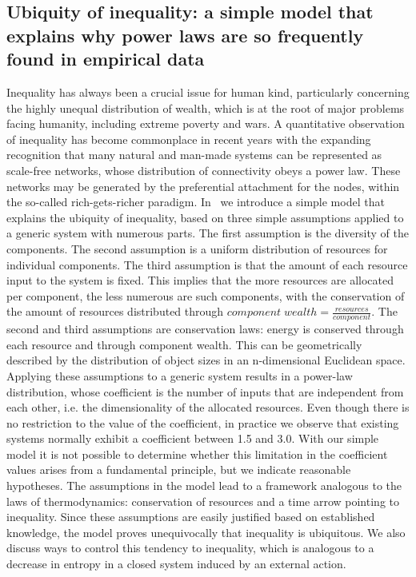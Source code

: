 \begin{apendicesenv}
\section{Ubiquity of inequality: a simple model that explains why power laws are so frequently found in empirical data}
	Inequality has always been a crucial issue for human kind, particularly concerning the highly unequal distribution of wealth, which is at the root of major problems facing humanity, including extreme poverty and wars.
	A quantitative observation of inequality has become commonplace in recent years
	with the expanding recognition that many natural and man-made systems can be represented as scale-free networks,
	whose distribution of connectivity obeys a power law.
	These networks may be generated by the preferential attachment for the nodes, within the so-called rich-gets-richer paradigm.
	In~\cite{ubiIne} we introduce a simple model that explains the ubiquity of inequality, based on three simple assumptions applied to a generic system with numerous parts.
	The first assumption is the diversity of the components.
	The second assumption is a uniform distribution of resources for individual components.
	The third assumption is that the amount of each resource input to the system is fixed.
	This implies that the more resources are allocated per component, the less numerous are such components,
	with the conservation of the amount of resources distributed through $component\; wealth = \frac{resources}{component}$.
	The second and third assumptions are conservation laws: energy is conserved through each resource and through component wealth.
	This can be geometrically described by the distribution of object sizes in an n-dimensional Euclidean space.
	Applying these assumptions to a generic system results in a power-law distribution, whose coefficient is the number of inputs that are independent from each other,
	i.e. the dimensionality of the allocated resources.
	Even though there is no restriction to the value of the coefficient,
	in practice we observe that existing systems normally exhibit a coefficient between 1.5 and 3.0.
	With our simple model it is not possible to determine whether this limitation in the coefficient values arises from a fundamental principle, but we indicate reasonable hypotheses.
	The assumptions in the model lead to a framework analogous to the laws of thermodynamics:
	conservation of resources and a time arrow pointing to inequality.
	Since these assumptions are easily justified based on established knowledge,
	the model proves unequivocally that inequality is ubiquitous.
	We also discuss ways to control this tendency to inequality,
	which is analogous to a decrease in entropy in a closed system induced by an external action.


\end{apendicesenv}

